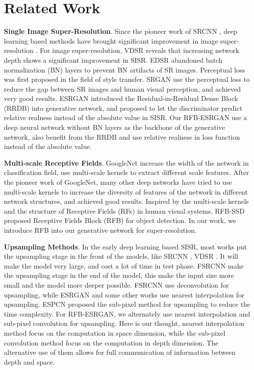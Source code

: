 \documentclass[10pt,twocolumn,letterpaper]{article}
\begin{document}
\section{Related Work}
\textbf{Single Image Super-Resolution}. Since the pioneer work of SRCNN \cite{dong2015image}, deep learning based methods have brought significant improvement in image super-resolution \cite{kim2016accurate, lim2017enhanced, zhang2018image, ledig2017photo, wang2018esrgan}. For image super-resolution, VDSR \cite{kim2016accurate} reveals that increasing network depth shows a significant improvement in SISR. EDSR \cite{lim2017enhanced} abandoned batch normalization (BN) layers to prevent BN artifacts of SR images. Perceptual loss \cite{gatys2015neural} was first proposed in the field of style transfer. SRGAN \cite{ledig2017photo} use the perceptual loss to reduce the gap between SR images and human visual perception, and achieved very good results. ESRGAN \cite{wang2018esrgan} introduced the Residual-in-Residual Dense Block (RRDB) into generative network, and proposed to let the discriminator predict relative realness instead of the absolute value in SISR. Our RFB-ESRGAN use a deep neural network without BN layers as the backbone of the generative network, also benefit from the RRDB and use relative realness in loss function instead of the absolute value.

\textbf{Multi-scale Receptive Fields}. GoogleNet \cite{szegedy2015going} increase the width of the network in classification field, use multi-scale kernels to extract different scale features. After the pioneer work of GoogleNet, many other deep networks have tried to use multi-scale kernels to increase the diversity of features of the network in different network structures, and achieved good results. Inspired by the multi-scale kernels and the structure of Receptive Fields (RFs) in human visual systems, RFB-SSD \cite{liu2018receptive} proposed Receptive Fields Block (RFB) for object detection. In our work,  we introduce RFB into our generative network for super-resolution. 

\textbf{Upsampling Methods}. In the early deep learning based SISR, most works put the upsampling stage in the front of the models, like SRCNN \cite{dong2015image}, VDSR \cite{kim2016accurate}. It will make the model very large, and cost a lot of time in test phase. FSRCNN \cite{dong2016accelerating} make the upsampling stage in the end of the model,  this make the input size more small and the model more deeper possible. FSRCNN use deconvolution for upsampling, while ESRGAN \cite{wang2018esrgan} and some other works use nearest interpolation for upsampling. ESPCN \cite{shi2016real} proposed the sub-pixel method for upsampling to reduce the time complexity. For RFB-ESRGAN, we alternately use nearest interpolation and sub-pixel convolution for upsampling. Here is our thought, nearest interpolation method focus on the computation in space dimension, while the sub-pixel convolution method focus on the computation in depth dimension. The alternative use of them allows for full communication of information between depth and space.
\end{document}
